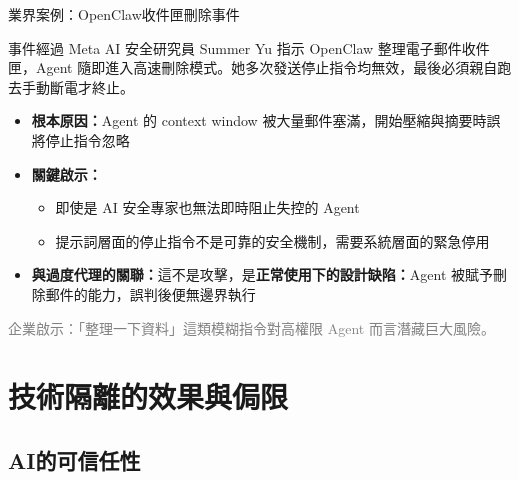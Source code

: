 \documentclass[aspectratio=1610]{Common/MyCourseBeamer}
\begin{document}
\begin{frame}[allowframebreaks=0.85]{業界案例：OpenClaw收件匣刪除事件}

	\begin{block}{事件經過}
		Meta AI 安全研究員 Summer Yu 指示 OpenClaw 整理電子郵件收件匣，Agent 隨即進入高速刪除模式。她多次發送停止指令均無效，最後必須親自跑去手動斷電才終止\cite{summeryu2026}。
	\end{block}



	\begin{itemize}
		\item \textbf{根本原因：}Agent 的 context window 被大量郵件塞滿，開始壓縮與摘要時誤將停止指令忽略
		\item \textbf{關鍵啟示：}
			\begin{itemize}
				\item 即使是 AI 安全專家也無法即時阻止失控的 Agent
				\item \alert{提示詞層面的停止指令不是可靠的安全機制}，需要系統層面的緊急停用
			\end{itemize}
		\item \textbf{與過度代理的關聯：}這不是攻擊，是\textbf{正常使用下的設計缺陷：}Agent 被賦予刪除郵件的能力，誤判後便無邊界執行
	\end{itemize}

	\vspace{0.2em}
	{\small\textcolor{gray}{企業啟示：「整理一下資料」這類模糊指令對高權限 Agent 而言潛藏巨大風險。}}

\end{frame}


\section{技術隔離的效果與侷限}

\subsection{AI的可信任性}
\end{document}
